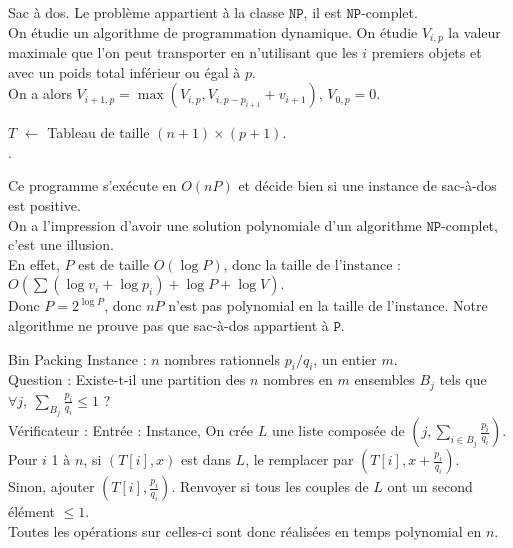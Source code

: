 \documentclass[french, 11pt]{article}
\renewcommand*{\P}{\texttt{P}}
\newcommand*{\NP}{\texttt{NP}}
\begin{document}
\begin{ex}{Sac à dos.}{}
    Le problème appartient à la classe $\NP$, il est $\NP$-complet.\\
    On étudie un algorithme de programmation dynamique. On étudie $V_{i,p}$ la valeur maximale que l'on peut transporter en n'utilisant que les $i$ premiers objets et avec un poids total inférieur ou égal à $p$.\\
    On a alors $V_{i+1,p}=\max(V_{i,p}, V_{i,p-p_{i+1}} + v_{i+1})$, $V_{0,p}=0$.\\
    \begin{algorithm}[H]
        \caption{Algorithme de programmation dynamique sac à dos.}
        $T$ $\gets$ Tableau de taille $(n+1)\times(p+1)$.\\
        .
    \end{algorithm}
    Ce programme s'exécute en $O(nP)$ et décide bien si une instance de sac-à-dos est positive.\\
    On a l'impression d'avoir une solution polynomiale d'un algorithme $\NP$-complet, c'est une illusion.\\
    En effet, $P$ est de taille $O(\log P)$, donc la taille de l'instance : $O(\sum(\log v_i + \log p_i) + \log P + \log V)$.\\
    Donc $P=2^{\log P}$, donc $nP$ n'est pas polynomial en la taille de l'instance. Notre algorithme ne prouve pas que sac-à-dos appartient à $\P$.
\end{ex}

\begin{ex}{Bin Packing}{}
    Instance : $n$ nombres rationnels $p_i/q_i$, un entier $m$.\\
    Question : Existe-t-il une partition des $n$ nombres en $m$ ensembles $B_j$ tels que $\forall j, ~ \sum_{B_j}\frac{p_i}{q_i}\leq 1$ ?\\
    Vérificateur : Entrée : Instance, On crée $L$ une liste composée de $(j,\sum_{i\in B_j}\frac{p_i}{q_i})$.
    Pour $i$ 1 à $n$, si $(T[i],x)$ est dans $L$, le remplacer par $(T[i],x+\frac{p_i}{q_i})$.\\
    Sinon, ajouter $(T[i],\frac{p_i}{q_i})$. Renvoyer si tous les couples de $L$ ont un second élément $\leq 1$.\\
    Toutes les opérations sur celles-ci sont donc réalisées en temps polynomial en $n$.
\end{ex}
\end{document}
